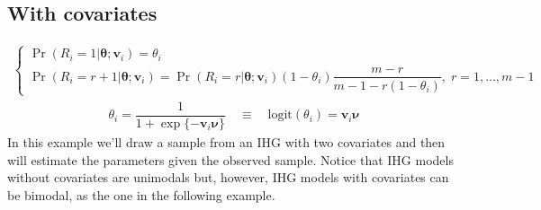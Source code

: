 \documentclass[letterpaper,10pt,english]{sphinxmanual}
\begin{document}
\subsection{With covariates}
\label{\detokenize{manual:ihg-with-covariates}}\label{\detokenize{manual:id39}}
\sphinxAtStartPar
{}
\begin{equation*}
\begin{split}\left\{
\begin{array}{l}
    \Pr(R_i=1|\pmb\theta;\pmb v_i) = \theta_i
    \\
    \Pr(R_i=r+1|\pmb\theta;\pmb v_i) = \Pr(R_i=r|\pmb\theta;\pmb v_i)(1-\theta_i)\dfrac{m-r}{m-1-r(1-\theta_i)},\; r= 1, \ldots, m-1
\end{array}
\right.\end{split}
\end{equation*}\begin{equation*}
\begin{split}\theta_i = \dfrac{1}{1 + \exp\{ - \pmb v_i \pmb \nu \}}
\quad \equiv \quad
\mathrm{logit}(\theta_i) = \pmb v_i \pmb \nu\end{split}
\end{equation*}
\sphinxAtStartPar
In this example we’ll draw a sample from an IHG with two covariates
and then will estimate the parameters given the observed sample.
Notice that IHG models without covariates are unimodals but, however,
IHG models with covariates can be bimodal, as the one in the following example.
\def\sphinxLiteralBlockLabel{\label{\detokenize{manual:id63}}}
\end{document}
